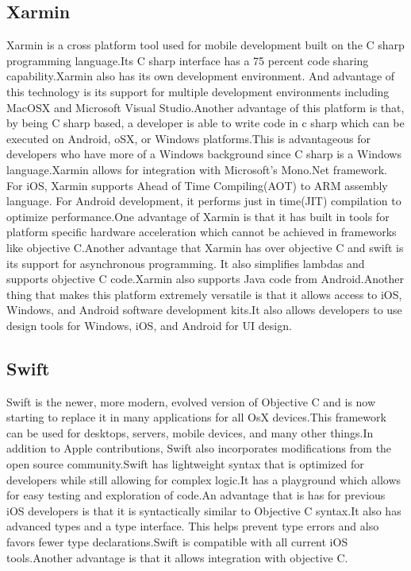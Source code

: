 \documentclass[onecolumn, draftclsnofoot,10pt, compsoc]{IEEEtran}
\begin{document}
    \subsection{Xarmin}
    Xarmin is a cross platform tool used for mobile development built on the C sharp programming language.Its C sharp interface has a 75 percent code sharing capability.Xarmin also has its own development environment. And advantage of this technology is its support for multiple development environments including MacOSX and Microsoft Visual Studio.Another advantage of this platform is that, by being C sharp based, a developer is able to write code in c sharp which can be executed on Android, oSX, or Windows platforms.This is advantageous for developers who have more of a Windows background since C sharp is a Windows language.Xarmin allows for integration with Microsoft's Mono.Net framework. For iOS, Xarmin supports Ahead of Time Compiling(AOT) to ARM assembly language. For Android development, it performs just in time(JIT) compilation to optimize performance.One advantage of Xarmin is that it has built in tools for platform specific hardware acceleration which cannot be achieved in frameworks like objective C.Another advantage that Xarmin has over objective C and swift is its support for asynchronous programming. It also simplifies lambdas and supports objective C code.Xarmin also supports Java code from Android.Another thing that makes this platform extremely versatile is that it allows access to iOS, Windows, and Android software development kits.It also allows developers to use design tools for Windows, iOS, and Android for UI design.\cite{Xarmin}
    \subsection{Swift}
     Swift is the newer, more modern, evolved version of Objective C and is now starting to replace it in many applications for all OsX devices.This framework can be used for desktops, servers, mobile devices, and many other things.In addition to Apple contributions, Swift also incorporates modifications from the open source community.Swift has lightweight syntax that is optimized for developers while still allowing for complex logic.It has a playground which allows for easy testing and exploration of code.An advantage that is has for previous iOS developers is that it is syntactically similar to Objective C syntax.It also has advanced types  and a type interface. This helps prevent type errors and also favors fewer type declarations.Swift is compatible with all current iOS tools.Another advantage is that it allows integration with objective C.\cite{Swift}
\end{document}
